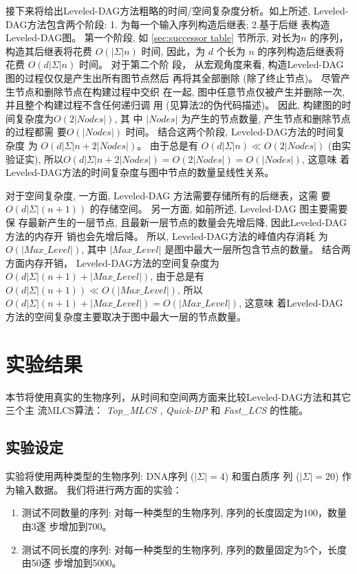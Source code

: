 接下来将给出Leveled-DAG方法粗略的时间/空间复杂度分析。如上所述,
Leveled-DAG方法包含两个阶段: 1. 为每一个输入序列构造后继表; 2.基于后继
表构造Leveled-DAG图。 第一个阶段, 如 \ref{sec:successor table} 节所示,
对长为$n$ 的序列，构造其后继表将花费 $O(|\Sigma|n)$ 时间, 因此，为 $d$
个长为 $n$ 的序列构造后继表将花费 $O(d|\Sigma|n)$ 时间。 对于第二个阶
段， 从宏观角度来看, 构造Leveled-DAG 图的过程仅仅是产生出所有图节点然后
再将其全部删除 (除了终止节点)。 尽管产生节点和删除节点在构建过程中交织
在一起, 图中任意节点仅被产生并删除一次, 并且整个构建过程不含任何递归调
用 (见算法2的伪代码描述)。 因此, 构建图的时间复杂度为$O(2|Nodes|)$, 其
中 $|Nodes|$ 为产生的节点数量, 产生节点和删除节点的过程都需
要$O(|Nodes|)$ 时间。 结合这两个阶段, Leveled-DAG方法的时间复杂度
为 $O(d|\Sigma|n + 2|Nodes|)$。 由于总是有 $O(d|\Sigma|n) \ll
O(2|Nodes|)$ (由实验证实),
所以$O(d|\Sigma|n + 2|Nodes|) = O(2|Nodes|) = O(|Nodes|)$, 这意味
着Leveled-DAG方法的时间复杂度与图中节点的数量呈线性关系。

对于空间复杂度, 一方面, Leveled-DAG 方法需要存储所有的后继表，这需
要 $O(d|\Sigma|(n+1))$ 的存储空间。 另一方面, 如前所述, Leveled-DAG 图主要需要保
存最新产生的一层节点, 且最新一层节点的数量会先增后降, 因此Leveled-DAG方法的内存开
销也会先增后降。 所以, Leveled-DAG方法的峰值内存消耗
为 $O(|Max\_Level|)$, 其中 $|Max\_Level|$ 是图中最大一层所包含节点的数量。 结合两
方面内存开销， Leveled-DAG方法的空间复杂度为 $O(d|\Sigma|(n+1) + |Max\_Level|)$,
由于总是有 $O(d|\Sigma|(n+1)) \ll O(|Max\_Level|)$, 所以
$O(d|\Sigma|(n+1) + |Max\_Level|) = O(|Max\_Level|)$, 这意味
着Leveled-DAG方法的空间复杂度主要取决于图中最大一层的节点数量。


\section{实验结果}
\label{sec:4_experiments}

本节将使用真实的生物序列，从时间和空间两方面来比较Leveled-DAG方法和其它三个主
流MLCS算法： \emph{Top\_MLCS} \cite{Li2016_ICDE}, \emph{Quick-DP}
\cite{Wang2011} 和 \emph{Fast\_LCS} \cite{Chen2006} 的性能。

\subsection{实验设定}
\label{Test problems}

实验将使用两种类型的生物序列: DNA序列 ($|\Sigma|=4$) 和蛋白质序
列 ($|\Sigma|=20$) 作为输入数据。 我们将进行两方面的实验：

\begin{enumerate}
\item 测试不同数量的序列: 对每一种类型的生物序列, 序列的长度固定为100，数量由3逐
  步增加到700。
\item 测试不同长度的序列: 对每一种类型的生物序列, 序列的数量固定为5个，长度由50逐
  步增加到5000。
\end{enumerate}

